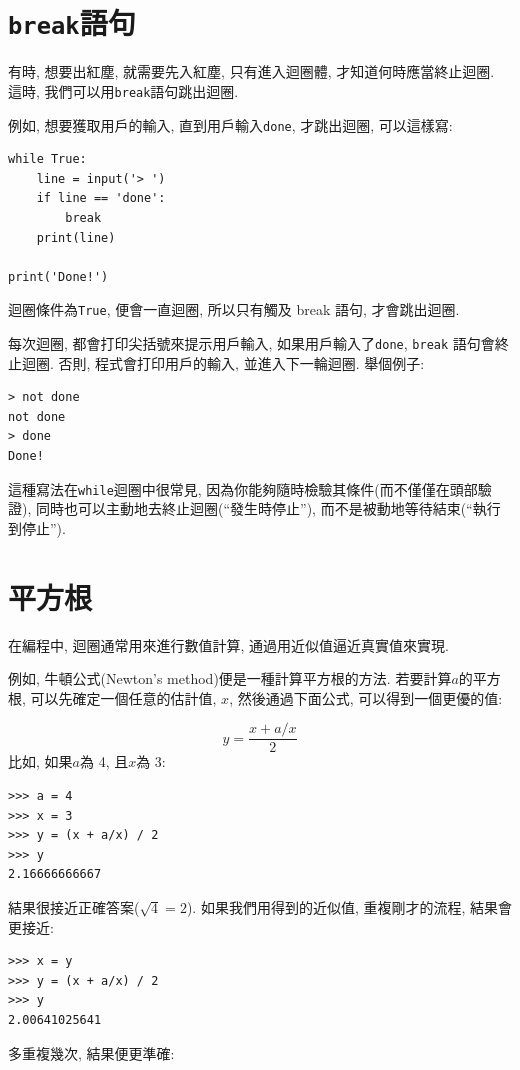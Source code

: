 \documentclass[10pt]{book}
\begin{document}
\section{{\tt break}語句}
有時, 想要出紅塵, 就需要先入紅塵, 只有進入迴圈體, 
才知道何時應當終止迴圈. 
這時, 我們可以用{\tt break}語句跳出迴圈. 

例如, 想要獲取用戶的輸入, 直到用戶輸入{\tt done}, 才跳出迴圈, 可以這樣寫:

\begin{verbatim}
while True:
    line = input('> ')
    if line == 'done':
        break
    print(line)

print('Done!')
\end{verbatim}
%
迴圈條件為{\tt True}, 便會一直迴圈, 所以只有觸及 break 語句, 才會跳出迴圈. 

每次迴圈, 都會打印尖括號來提示用戶輸入, 
如果用戶輸入了{\tt done}, {\tt break} 語句會終止迴圈. 
否則, 程式會打印用戶的輸入, 並進入下一輪迴圈. 
舉個例子:

\begin{verbatim}
> not done
not done
> done
Done!
\end{verbatim}
%
這種寫法在{\tt while}迴圈中很常見, 
因為你能夠隨時檢驗其條件(而不僅僅在頭部驗證), 
同時也可以主動地去終止迴圈(``發生時停止''), 
而不是被動地等待結束(``執行到停止'').


\section{平方根}
\label{squareroot}

在編程中, 迴圈通常用來進行數值計算, 通過用近似值逼近真實值來實現. 

例如, 牛頓公式(Newton's method)便是一種計算平方根的方法. 
若要計算$a$的平方根, 可以先確定一個任意的估計值, $x$, 
然後通過下面公式, 可以得到一個更優的值:

\[ y = \frac{x + a/x}{2} \]
%
比如, 如果$a$為 4, 且$x$為 3:

\begin{verbatim}
>>> a = 4
>>> x = 3
>>> y = (x + a/x) / 2
>>> y
2.16666666667
\end{verbatim}
%
結果很接近正確答案($\sqrt{4} = 2$).
如果我們用得到的近似值, 重複剛才的流程, 結果會更接近:

\begin{verbatim}
>>> x = y
>>> y = (x + a/x) / 2
>>> y
2.00641025641
\end{verbatim}
%
多重複幾次, 結果便更準確:
\end{document}
